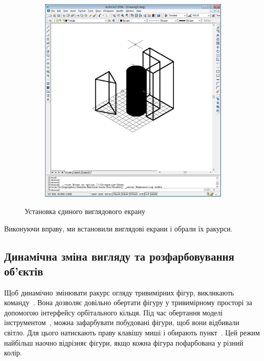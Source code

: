 \documentclass[
	a4paper,
	oneside,
	BCOR = 10mm,
	DIV = 12,
	12pt,
	headings = normal,
]{scrartcl}
\newlength{\gridunitwidth}
\begin{document}
\begin{figure}[!htbp]
\begin{subfigure}[b]{4 \gridunitwidth}
					\includegraphics[width = \columnwidth]{./assets/p14.png}
					\caption{}
					\label{subfig:05-viewport-single-02}
				\end{subfigure}
				\caption{Установка єдиного виглядового екрану}
				\label{fig:04-viewport-single}
			\end{figure}

			Виконуючи вправу, ми встановили виглядові екрани і обрали їх ракурси.

		\subsection{Динамічна зміна вигляду та розфарбовування об'єктів}
			Щоб динамічно змінювати ракурс огляду тривимірних фігур, викликають команду~. Вона дозволяє довільно обертати фігуру у тривимірному просторі за допомогою інтерфейсу орбітального кільця. Під час обертання моделі інструментом~, можна зафарбувати побудовані фігури, щоб вони відбивали світло. Для цього натискають праву клавішу миші і обирають пункт~. Цей режим найбільш наочно відрізняє фігури, якщо кожна фігура пофарбована у різний колір.
\end{document}

